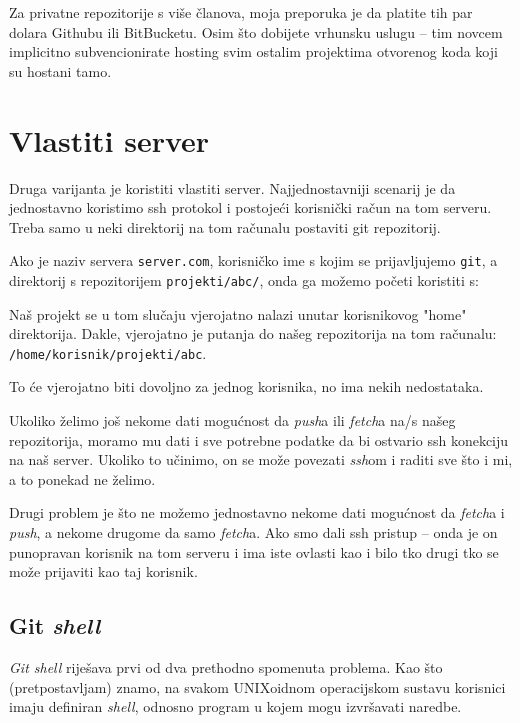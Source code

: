 Za privatne repozitorije s više članova, moja preporuka je da platite tih par dolara Githubu ili BitBucketu. 
Osim što dobijete vrhunsku uslugu -- tim novcem implicitno subvencionirate hosting svim ostalim projektima otvorenog koda koji su hostani tamo.

\section*{Vlastiti server}

Druga varijanta je koristiti vlastiti server.
Najjednostavniji scenarij je da jednostavno koristimo ssh protokol i postojeći korisnički račun na tom serveru. 
Treba samo u neki direktorij na tom računalu postaviti git repozitorij.

Ako je naziv servera \verb+server.com+, korisničko ime s kojim se prijavljujemo \verb+git+, a direktorij s repozitorijem \verb+projekti/abc/+, onda ga možemo početi koristiti s:


Naš projekt se u tom slučaju vjerojatno nalazi unutar korisnikovog "home" direktorija.
Dakle, vjerojatno je putanja do našeg repozitorija na tom računalu: \\\verb+/home/korisnik/projekti/abc+.

To će vjerojatno biti dovoljno za jednog korisnika, no ima nekih nedostataka.

Ukoliko želimo još nekome dati mogućnost da \emph{push}a ili \emph{fetch}a na/s našeg repozitorija, 
moramo mu dati i sve potrebne podatke da bi ostvario ssh konekciju na naš server.
Ukoliko to učinimo, on se može povezati \emph{ssh}om i raditi sve što i mi, a to ponekad ne želimo.

Drugi problem je što ne možemo jednostavno nekome dati mogućnost da \emph{fetch}a i \emph{push}, a nekome drugome da samo \emph{fetch}a.
Ako smo dali ssh pristup -- onda je on punopravan korisnik na tom serveru i ima iste ovlasti kao i bilo tko drugi tko se može prijaviti kao taj korisnik.

\subsection*{Git \emph{shell}}

\emph{Git shell} riješava prvi od dva prethodno spomenuta problema. 
Kao što (pretpostavljam) znamo, na svakom UNIXoidnom operacijskom sustavu korisnici imaju definiran \emph{shell}, odnosno program u kojem mogu izvršavati naredbe.

